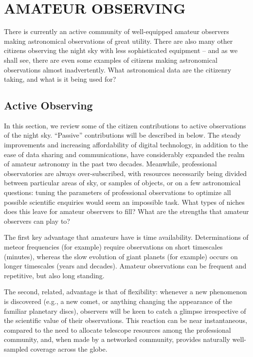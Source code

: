 \documentclass{ar2e}
\begin{document}

\section{AMATEUR OBSERVING}
\label{sec:obs}

There is currently an active community of well-equipped amateur observers making
astronomical observations of great utility. There are also many other citizens
observing the night sky with less sophisticated equipment -- and as we shall
see, there are even some examples of citizens making astronomical observations
almost inadvertently. What astronomical data are the citizenry taking, and what
is it being used for?



\subsection{Active Observing}
\label{sec:obs:active}

In this section, we review some of the citizen contributions to active
observations of the night sky.  ``Passive'' contributions  will be described in
 below. The steady improvements and increasing
affordability of digital technology, in addition to the ease of data sharing and
communications, have considerably expanded the realm of amateur astronomy in the
past two decades.  Meanwhile, professional observatories are always
over-subscribed, with resources necessarily being divided between particular
areas of sky, or samples of objects, or on a few astronomical questions: tuning
the parameters of professional observations to optimize all possible scientific
enquiries would seem an impossible task. What types of  niches does this leave
for amateur observers to fill? What are the strengths that amateur observers can
play to?

The first key advantage that amateurs have is time availability. Determinations
of meteor frequencies (for example) require observations on short timescales
(minutes), whereas the slow evolution of giant planets (for example) occurs on
longer timescales (years and decades).  Amateur observations can be frequent and
repetitive, but also long standing. 

The second, related, advantage is that of flexibility: whenever a new phenomenon
is discovered (e.g., a new comet, or anything changing the appearance of the
familiar planetary discs), observers will be keen to catch a glimpse
irrespective of the scientific value of their observations.  This reaction can
be near instantaneous, compared to the need to allocate telescope resources
among the professional community, and, when made by a networked community,
provides naturally well-sampled coverage across the globe.
\end{document}
